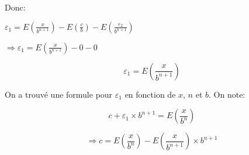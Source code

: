 \documentclass[a4paper, 12pt]{article}
\begin{document}
Donc:

$\varepsilon_{1} =
E \left( \frac{x}{b^{n+1}} \right) -
E \left( \frac{c}{b} \right) - 
E \left( \frac{\varepsilon_{2}}{b^{n+1}} \right)$

$\Rightarrow \varepsilon_{1} = E \left( \frac{x}{b^{n+1}} \right) - 0 - 0$

\[
\varepsilon_{1} = E \left( \frac{x}{b^{n+1}} \right)
\]

\noindent On a trouvé une formule pour $\varepsilon_{1}$ en fonction de $x$, $n$ et $b$. On note:

\[
c + \varepsilon_{1} \times b^{n+1} = E \left( \frac{x}{b^{n}} \right)
\]

\[
\Rightarrow c = E \left( \frac{x}{b^{n}} \right) - E \left( \frac{x}{b^{n+1}} \right) \times b^{n+1}
\]
\end{document}
